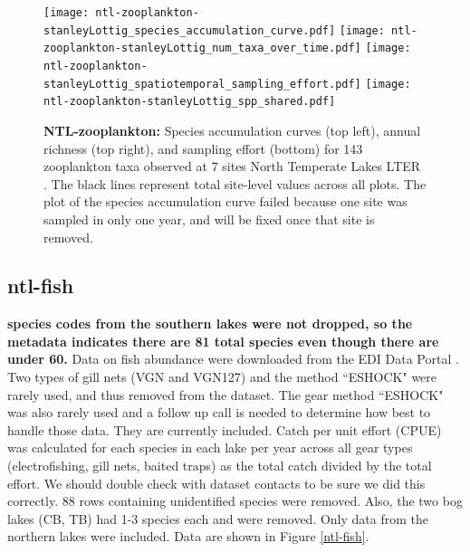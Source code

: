 \documentclass[11pt, oneside]{article}
\begin{document}
\begin{figure}[h!]
\centering
\texttt{[image: ntl-zooplankton-stanleyLottig\_species\_accumulation\_curve.pdf]}
\texttt{[image: ntl-zooplankton-stanleyLottig\_num\_taxa\_over\_time.pdf]}
\texttt{[image: ntl-zooplankton-stanleyLottig\_spatiotemporal\_sampling\_effort.pdf]}
\texttt{[image: ntl-zooplankton-stanleyLottig\_spp\_shared.pdf]}
\caption{{\bf NTL-zooplankton:} Species accumulation curves (top left),  annual richness (top right), and sampling effort (bottom)  for 143 zooplankton taxa observed at 7 sites North Temperate Lakes LTER . The black lines represent total site-level values across all plots. The plot of the species accumulation curve failed because one site was sampled in only one year, and will be fixed once that site is removed.}
\label{ntl-zooplankton}
\end{figure}


\subsection {ntl-fish}
{\bf species codes from the southern lakes were not dropped, so the metadata indicates there are 81 total species even though there are under 60.}
Data on fish abundance were downloaded from the EDI Data Portal \citep{ntl-fish}.
Two types of gill nets (VGN and VGN127) and the method  ``ESHOCK" were rarely used, and thus removed from the dataset.%
The gear method ``ESHOCK" was also rarely used and a follow up call is needed to determine how best to handle those data.
They are currently included.
Catch per unit effort (CPUE) was calculated for each species in each lake per year across all gear types (electrofishing, gill nets, baited traps) as the total catch divided by the total effort.
We should double check with dataset contacts to be sure we did this correctly.
88 rows containing unidentified species were removed.
Also, the two bog lakes (CB, TB) had 1-3 species each and were removed. 
Only data from the northern lakes were included.
Data are shown in Figure \ref{ntl-fish}.
\end{document}
